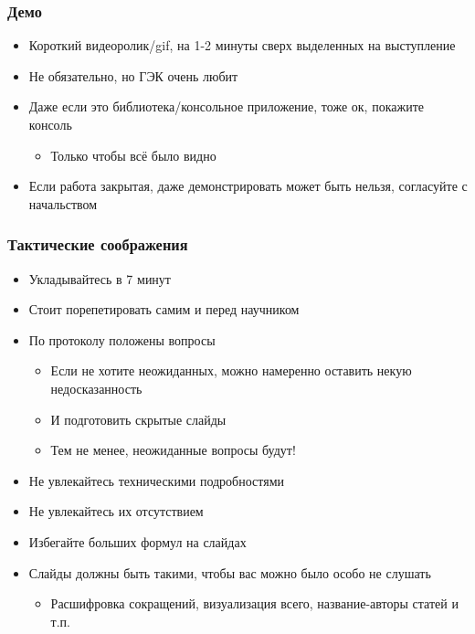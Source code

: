 \documentclass[xetex,mathserif,serif]{beamer}
\begin{document}
    \begin{frame}
        \frametitle{Демо}
        \begin{itemize}
            \item Короткий видеоролик/gif, на 1-2 минуты сверх выделенных на выступление
            \item Не обязательно, но ГЭК очень любит
            \item Даже если это библиотека/консольное приложение, тоже ок, покажите консоль
            \begin{itemize}
                \item Только чтобы всё было видно
            \end{itemize}
            \item Если работа закрытая, даже демонстрировать может быть нельзя, согласуйте с начальством
        \end{itemize}
    \end{frame}

    \begin{frame}
        \frametitle{Тактические соображения}
        \begin{itemize}
            \item Укладывайтесь в 7 минут
            \item Стоит порепетировать самим и перед научником
            \item По протоколу положены вопросы
            \begin{itemize}
                \item Если не хотите неожиданных, можно намеренно оставить некую недосказанность
                \item И подготовить скрытые слайды
                \item Тем не менее, неожиданные вопросы будут!
            \end{itemize}
            \item Не увлекайтесь техническими подробностями
            \item Не увлекайтесь их отсутствием
            \item Избегайте больших формул на слайдах
            \item Слайды должны быть такими, чтобы вас можно было особо не слушать
            \begin{itemize}
                \item Расшифровка сокращений, визуализация всего, название-авторы статей и т.п.
            \end{itemize}
        \end{itemize}
    \end{frame}
\end{document}
